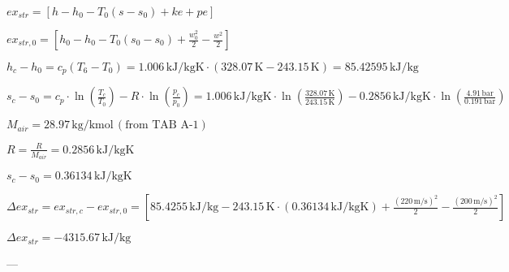 \( ex_{str} = [ h - h_0 - T_0 (s - s_0) + ke + pe ] \)  

\( ex_{str,0} = [ h_0 - h_0 - T_0 (s_0 - s_0) + \frac{w_0^2}{2} - \frac{w^2}{2} ] \)  

\( h_c - h_0 = c_p (T_6 - T_0) = 1.006 \, \text{kJ/kgK} \cdot (328.07 \, \text{K} - 243.15 \, \text{K}) = 85.42595 \, \text{kJ/kg} \)  

\( s_c - s_0 = c_p \cdot \ln \left( \frac{T_c}{T_0} \right) - R \cdot \ln \left( \frac{p_c}{p_0} \right) = 1.006 \, \text{kJ/kgK} \cdot \ln \left( \frac{328.07 \, \text{K}}{243.15 \, \text{K}} \right) - 0.2856 \, \text{kJ/kgK} \cdot \ln \left( \frac{4.91 \, \text{bar}}{0.191 \, \text{bar}} \right) \)  

\( M_{air} = 28.97 \, \text{kg/kmol} \, (\text{from TAB A-1}) \)  

\( R = \frac{R}{M_{air}} = 0.2856 \, \text{kJ/kgK} \)  

\( s_c - s_0 = 0.36134 \, \text{kJ/kgK} \)  

\( \Delta ex_{str} = ex_{str,c} - ex_{str,0} = [ 85.4255 \, \text{kJ/kg} - 243.15 \, \text{K} \cdot (0.36134 \, \text{kJ/kgK}) + \frac{(220 \, \text{m/s})^2}{2} - \frac{(200 \, \text{m/s})^2}{2} ] \)  

\( \Delta ex_{str} = -4315.67 \, \text{kJ/kg} \)  

---